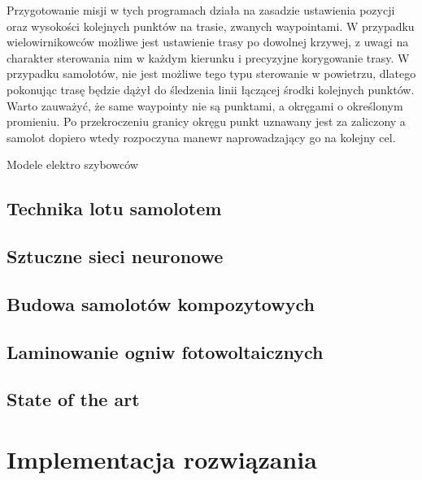 \documentclass[12pt, a4paper]{article}
\begin{document}
Przygotowanie misji w tych programach działa na zasadzie ustawienia pozycji oraz wysokości kolejnych punktów na trasie, zwanych waypointami. W przypadku wielowirnikowców możliwe jest ustawienie trasy po dowolnej krzywej, z uwagi na charakter sterowania nim w każdym kierunku i precyzyjne korygowanie trasy. W przypadku samolotów, nie jest możliwe tego typu sterowanie w powietrzu, dlatego pokonując trasę będzie dążył do śledzenia linii łączącej środki kolejnych punktów. Warto zauważyć, że same waypointy nie są punktami, a okręgami o określonym promieniu. Po przekroczeniu granicy okręgu punkt uznawany jest za zaliczony a samolot dopiero wtedy rozpoczyna manewr naprowadzający go na kolejny cel.

Modele elektro szybowców

\subsection{Technika lotu samolotem}
\subsection{Sztuczne sieci neuronowe}
\subsection{Budowa samolotów kompozytowych}
\subsection{Laminowanie ogniw fotowoltaicznych}
\subsection{State of the art}
\clearpage
\section{Implementacja rozwiązania}
\end{document}
